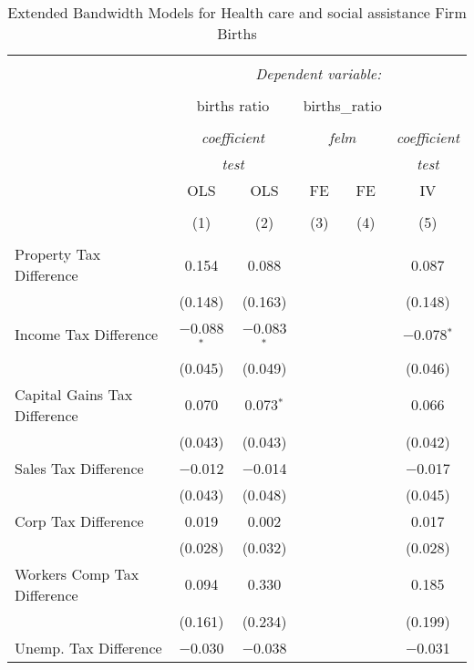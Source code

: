
\begin{table}[!htbp] \centering 
  \caption{Extended Bandwidth Models for  Health care and social assistance Firm Births} 
  \label{} 
\begin{tabular}{@{\extracolsep{5pt}}lccccc} 
\\[-1.8ex]\hline 
\hline \\[-1.8ex] 
 & \multicolumn{5}{c}{\textit{Dependent variable:}} \\ 
\cline{2-6} 
\\[-1.8ex] & \multicolumn{2}{c}{births ratio} & \multicolumn{2}{c}{births\_ratio} &   \\ 
\\[-1.8ex] & \multicolumn{2}{c}{\textit{coefficient}} & \multicolumn{2}{c}{\textit{felm}} & \textit{coefficient} \\ 
 & \multicolumn{2}{c}{\textit{test}} & \multicolumn{2}{c}{\textit{}} & \textit{test} \\ 
 & OLS & OLS & FE & FE & IV \\ 
\\[-1.8ex] & (1) & (2) & (3) & (4) & (5)\\ 
\hline \\[-1.8ex] 
 Property Tax Difference & 0.154 & 0.088 &  &  & 0.087 \\ 
  & (0.148) & (0.163) &  &  & (0.148) \\ 
  Income Tax Difference & $-$0.088$^{*}$ & $-$0.083$^{*}$ &  &  & $-$0.078$^{*}$ \\ 
  & (0.045) & (0.049) &  &  & (0.046) \\ 
  Capital Gains Tax Difference & 0.070 & 0.073$^{*}$ &  &  & 0.066 \\ 
  & (0.043) & (0.043) &  &  & (0.042) \\ 
  Sales Tax Difference & $-$0.012 & $-$0.014 &  &  & $-$0.017 \\ 
  & (0.043) & (0.048) &  &  & (0.045) \\ 
  Corp Tax Difference & 0.019 & 0.002 &  &  & 0.017 \\ 
  & (0.028) & (0.032) &  &  & (0.028) \\ 
  Workers Comp Tax Difference & 0.094 & 0.330 &  &  & 0.185 \\ 
  & (0.161) & (0.234) &  &  & (0.199) \\ 
  Unemp. Tax Difference & $-$0.030 & $-$0.038 &  &  & $-$0.031 \\ 

\end{tabular}
\end{table}
